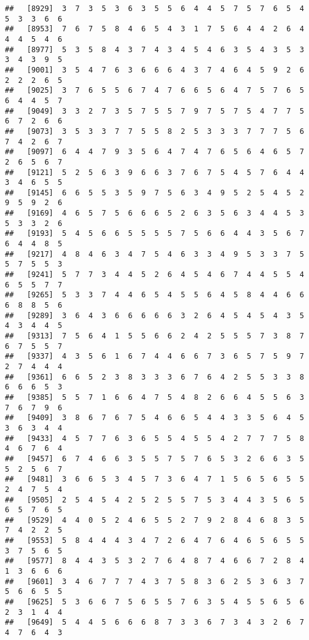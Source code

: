 \documentclass[
]{book}
\begin{document}
\begin{verbatim}
##   [8929]  3  7  3  5  3  6  3  5  5  6  4  4  5  7  5  7  6  5  4  5  3  3  6  6
##   [8953]  7  6  7  5  8  4  6  5  4  3  1  7  5  6  4  4  2  6  4  4  4  5  4  6
##   [8977]  5  3  5  8  4  3  7  4  3  4  5  4  6  3  5  4  3  5  3  3  4  3  9  5
##   [9001]  3  5  4  7  6  3  6  6  6  4  3  7  4  6  4  5  9  2  6  2  2  2  6  5
##   [9025]  3  7  6  5  5  6  7  4  7  6  6  5  6  4  7  5  7  6  5  6  4  4  5  7
##   [9049]  3  3  2  7  3  5  7  5  5  7  9  7  5  7  5  4  7  7  5  6  7  2  6  6
##   [9073]  3  5  3  3  7  7  5  5  8  2  5  3  3  3  7  7  7  5  6  7  4  2  6  7
##   [9097]  6  4  4  7  9  3  5  6  4  7  4  7  6  5  6  4  6  5  7  2  6  5  6  7
##   [9121]  5  2  5  6  3  9  6  6  3  7  6  7  5  4  5  7  6  4  4  3  4  6  5  5
##   [9145]  6  6  5  5  3  5  9  7  5  6  3  4  9  5  2  5  4  5  2  9  5  9  2  6
##   [9169]  4  6  5  7  5  6  6  6  5  2  6  3  5  6  3  4  4  5  3  5  3  3  2  6
##   [9193]  5  4  5  6  6  5  5  5  5  7  5  6  6  4  4  3  5  6  7  6  4  4  8  5
##   [9217]  4  8  4  6  3  4  7  5  4  6  3  3  4  9  5  3  3  7  5  5  7  5  5  3
##   [9241]  5  7  7  3  4  4  5  2  6  4  5  4  6  7  4  4  5  5  4  6  5  5  7  7
##   [9265]  5  3  3  7  4  4  6  5  4  5  5  6  4  5  8  4  4  6  6  6  8  8  5  6
##   [9289]  3  6  4  3  6  6  6  6  6  3  2  6  4  5  4  5  4  3  5  4  3  4  4  5
##   [9313]  7  5  6  4  1  5  5  6  6  2  4  2  5  5  5  7  3  8  7  6  7  5  5  7
##   [9337]  4  3  5  6  1  6  7  4  4  6  6  7  3  6  5  7  5  9  7  2  7  4  4  4
##   [9361]  6  6  5  2  3  8  3  3  3  6  7  6  4  2  5  5  3  3  8  6  6  6  5  3
##   [9385]  5  5  7  1  6  6  4  7  5  4  8  2  6  6  4  5  5  6  3  7  6  7  9  6
##   [9409]  3  8  6  7  6  7  5  4  6  6  5  4  4  3  3  5  6  4  5  3  6  3  4  4
##   [9433]  4  5  7  7  6  3  6  5  5  4  5  5  4  2  7  7  7  5  8  4  6  7  6  4
##   [9457]  6  7  4  6  6  3  5  5  7  5  7  6  5  3  2  6  6  3  5  5  2  5  6  7
##   [9481]  3  6  6  5  3  4  5  7  3  6  4  7  1  5  6  5  6  5  5  2  4  7  5  4
##   [9505]  2  5  4  5  4  2  5  2  5  5  7  5  3  4  4  3  5  6  5  6  5  7  6  5
##   [9529]  4  4  0  5  2  4  6  5  5  2  7  9  2  8  4  6  8  3  5  7  4  2  2  5
##   [9553]  5  8  4  4  4  3  4  7  2  6  4  7  6  4  6  5  6  5  5  3  7  5  6  5
##   [9577]  8  4  4  3  5  3  2  7  6  4  8  7  4  6  6  7  2  8  4  1  3  6  6  6
##   [9601]  3  4  6  7  7  7  4  3  7  5  8  3  6  2  5  3  6  3  7  5  6  6  5  5
##   [9625]  5  3  6  6  7  5  6  5  5  7  6  3  5  4  5  5  6  5  6  2  3  1  4  4
##   [9649]  5  4  4  5  6  6  6  8  7  3  3  6  7  3  4  3  2  6  7  4  7  6  4  3

\end{verbatim}
\end{document}
